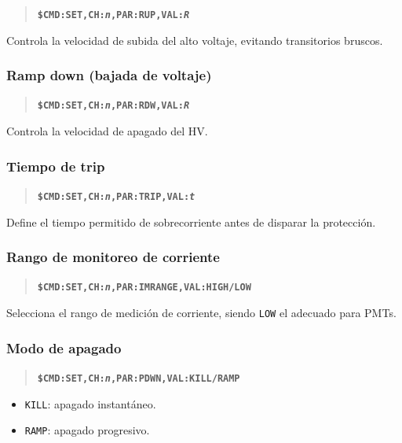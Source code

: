 \documentclass{article}
\begin{document}
\begin{quote}
\textbf{\texttt{\$CMD:SET,CH:\emph{n},PAR:RUP,VAL:\emph{R}}}
\end{quote}

Controla la velocidad de subida del alto voltaje, evitando transitorios bruscos.

\subsubsection{Ramp down (bajada de voltaje)}

\begin{quote}
\textbf{\texttt{\$CMD:SET,CH:\emph{n},PAR:RDW,VAL:\emph{R}}}
\end{quote}

Controla la velocidad de apagado del HV.

\subsubsection{Tiempo de trip}

\begin{quote}
\textbf{\texttt{\$CMD:SET,CH:\emph{n},PAR:TRIP,VAL:\emph{t}}}
\end{quote}

Define el tiempo permitido de sobrecorriente antes de disparar la protección.

\subsubsection{Rango de monitoreo de corriente}

\begin{quote}
\textbf{\texttt{\$CMD:SET,CH:\emph{n},PAR:IMRANGE,VAL:HIGH/LOW}}
\end{quote}

Selecciona el rango de medición de corriente, siendo \texttt{LOW} el adecuado para PMTs.

\subsubsection{Modo de apagado}

\begin{quote}
\textbf{\texttt{\$CMD:SET,CH:\emph{n},PAR:PDWN,VAL:KILL/RAMP}}
\end{quote}

\begin{itemize}
    \item \texttt{KILL}: apagado instantáneo.
    \item \texttt{RAMP}: apagado progresivo.
\end{itemize}
\end{document}
